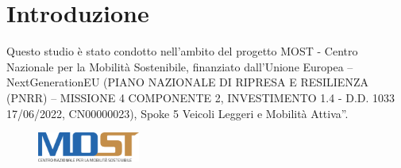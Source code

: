 \chapter*{Introduzione}
\label{chap:introduzione}

\noindent
Questo studio è stato condotto nell’ambito del progetto MOST - Centro Nazionale per la Mobilità Sostenibile, finanziato dall'Unione Europea – NextGenerationEU (PIANO NAZIONALE DI RIPRESA E RESILIENZA (PNRR) – MISSIONE 4 COMPONENTE 2, INVESTIMENTO 1.4 - D.D. 1033 17/06/2022, CN00000023), Spoke 5 Veicoli Leggeri e Mobilità Attiva”.

\begin{figure}[b]
    \centering
    \includegraphics[width=0.30\textwidth]{template/most.png}
\end{figure}